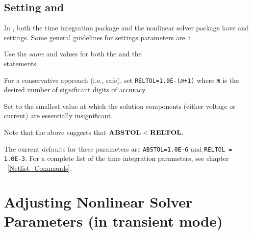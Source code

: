 \subsection{Setting  and }
In \Xyce{}, both the time integration package and the nonlinear solver package
have  and  settings.  Some general guidelines for
settings parameters are~\cite{Petzold:1996}:
\begin{XyceItemize}
\item Use the \emph{same}  and  values for both
  the  and the \\  
  statements.
\item For a conservative approach (i.e., safe), set \texttt{RELTOL=1.0E-(\emph{m}+1)}
  where \texttt{\emph{m}} is the desired number of significant digits of
  accuracy.
\item Set  to the smallest value at which the solution
  components (either voltage or current) are essentially insignificant.
\item Note that the above suggests that $\textrm{\textbf{ABSTOL}}<\textrm{\textbf{RELTOL}}$.
\end{XyceItemize}

The current defaults for these parameters are \texttt{ABSTOL=1.0E-6} and
\texttt{RELTOL = 1.0E-3}.  For a complete list of the time integration
parameters, see chapter ~\ref{Netlist_Commands}.

\section{Adjusting Nonlinear Solver Parameters (in transient mode)}

